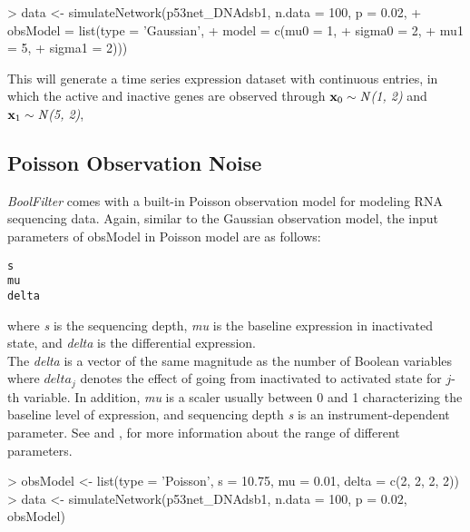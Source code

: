 \documentclass[a4paper]{article}
\theoremstyle{plain}
\theoremstyle{definition}
\theoremstyle{remark}
\def\N{{\bf \textit{N}}}
\def\xone{{\bf{x}}_{1}}
\def\xzero{{\bf{x}}_{0}}
\begin{document}
\begin{Schunk}
\begin{Sinput}
> data <- simulateNetwork(p53net_DNAdsb1, n.data = 100, p = 0.02,
+                       obsModel = list(type = 'Gaussian',
+                                       model = c(mu0 = 1, 
+                                              sigma0 = 2, 
+                                                 mu1 = 5, 
+                                             sigma1 = 2)))
\end{Sinput}
\end{Schunk}

This will generate a time series expression dataset with continuous entries,  in which the active and inactive genes are observed through $\xzero \sim \N$\textit{(1, 2)} and $\xone \sim \N$\textit{(5, 2)},

\subsection{Poisson Observation Noise}

\textit{BoolFilter} comes with a built-in Poisson observation model for modeling RNA sequencing data. Again, similar to the Gaussian observation model, the input parameters of obsModel in Poisson model are as follows:

\begin{verbatim}
s
mu
delta
\end{verbatim}

where \textit{s} is the sequencing depth, \textit{mu} is the baseline expression in inactivated state, and \textit{delta} is the differential expression.
\\[1em]
The \textit{delta} is a vector of the same magnitude as the number of Boolean variables where $delta_j$ denotes the effect of going from inactivated to activated state for $j$-th variable. In addition, \textit{mu} is a scaler usually between 0 and 1 characterizing the baseline level of expression, and sequencing depth \textit{s} is an instrument-dependent parameter. See \cite{ImanBrag:15b} and \cite{BahaBrag:15}, for more information about the range of different parameters.


\begin{Schunk}
\begin{Sinput}
> obsModel <- list(type = 'Poisson', s = 10.75, mu = 0.01, delta = c(2, 2, 2, 2))
> data <- simulateNetwork(p53net_DNAdsb1, n.data = 100, p = 0.02, obsModel)
\end{Sinput}
\end{Schunk}
\end{document}
